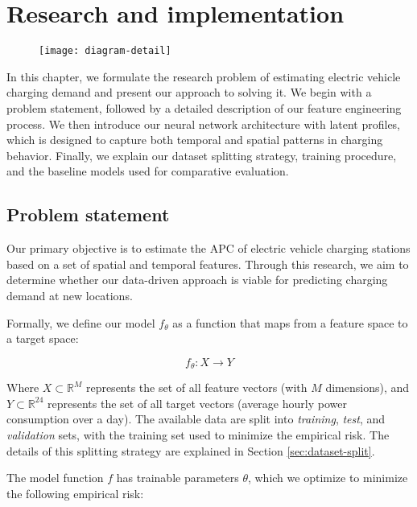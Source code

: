 \setchapterpreamble[u]{\margintoc}
\chapter{Research and implementation}
\label{ch:research}

\begin{figure}[hb]
    \texttt{[image: diagram-detail]}
\end{figure}



In this chapter, we formulate the research problem of estimating electric vehicle charging demand and present our approach to solving it. We begin with a problem statement, followed by a detailed description of our feature engineering process. We then introduce our neural network architecture with latent profiles, which is designed to capture both temporal and spatial patterns in charging behavior. Finally, we explain our dataset splitting strategy, training procedure, and the baseline models used for comparative evaluation.


\section{Problem statement}

Our primary objective is to estimate the \acrfull{APC} of electric vehicle charging stations based on a set of spatial and temporal features. Through this research, we aim to determine whether our data-driven approach is viable for predicting charging demand at new locations.

Formally, we define our model $f_\theta$ as a function that maps from a feature space to a target space:

\[
    f_{\theta}: X \rightarrow Y
\]

Where $X \subset \mathbb{R}^M$ represents the set of all feature vectors (with $M$ dimensions), and $Y \subset \mathbb{R}^{24}$ represents the set of all target vectors (average hourly power consumption over a day). The available data are split into \textit{training}, \textit{test}, and \textit{validation} sets, with the training set used to minimize the empirical risk. The details of this splitting strategy are explained in Section \ref{sec:dataset-split}.



The model function $f$ has trainable parameters $\theta$, which we optimize to minimize the following empirical risk:

